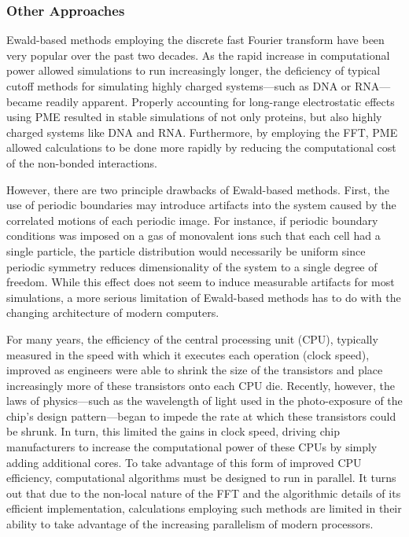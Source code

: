 \subsubsection{Other Approaches}

Ewald-based methods employing the discrete fast Fourier transform have been very
popular over the past two decades. As the rapid increase in computational power
allowed simulations to run increasingly longer, the deficiency of typical cutoff
methods for simulating highly charged systems---such as DNA or RNA---became
readily apparent. \cite{Miaskiewicz_JAmChemSoc_1993_v115_p1526,
McConnell_JAmChemSoc_1994_v116_p4461} Properly accounting for long-range
electrostatic effects using PME resulted in stable simulations of not only
proteins, but also highly charged systems like DNA and RNA.
\cite{Cheatham_JAmChemSoc_1995_v117_p4193} Furthermore, by employing the FFT,
PME allowed calculations to be done more rapidly by reducing the computational
cost of the non-bonded interactions.

However, there are two principle drawbacks of Ewald-based methods. First, the
use of periodic boundaries may introduce artifacts into the system caused by the
correlated motions of each periodic image.
\cite{Hunenberger_JChemPhys_1999_v110_p1856} For instance, if periodic boundary
conditions was imposed on a gas of monovalent ions such that each cell had a
single particle, the particle distribution would necessarily be uniform since
periodic symmetry reduces dimensionality of the system to a single degree of
freedom.  While this effect does not seem to induce measurable artifacts for
most simulations, \cite{Hunenberger_JChemPhys_1999_v110_p1856} a more serious
limitation of Ewald-based methods has to do with the changing architecture of
modern computers.

For many years, the efficiency of the central processing unit (CPU), typically
measured in the speed with which it executes each operation (\ie clock speed),
improved as engineers were able to shrink the size of the transistors and place
increasingly more of these transistors onto each CPU die. Recently, however, the
laws of physics---such as the wavelength of light used in the photo-exposure of
the chip's design pattern---began to impede the rate at which these transistors
could be shrunk. In turn, this limited the gains in clock speed, driving chip
manufacturers to increase the computational power of these CPUs by simply adding
additional cores. To take advantage of this form of improved CPU efficiency,
computational algorithms must be designed to run in parallel. It turns out that
due to the non-local nature of the FFT and the algorithmic details of its
efficient implementation, calculations employing such methods are limited in
their ability to take advantage of the increasing parallelism of modern
processors.

